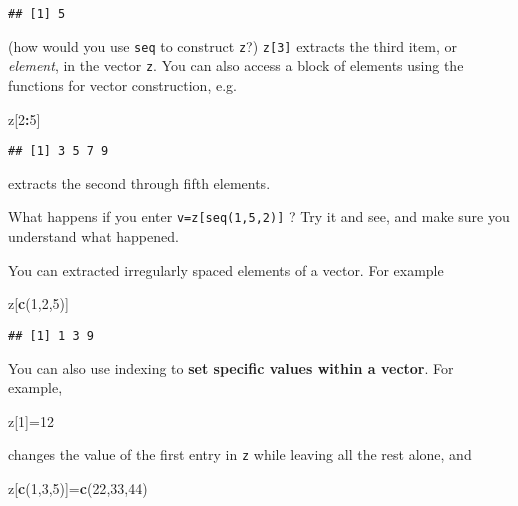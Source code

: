 \documentclass[11pt,]{article}
\newenvironment{Shaded}{\begin{snugshade}}{\end{snugshade}}
\newcommand{\KeywordTok}[1]{\textcolor[rgb]{0.13,0.29,0.53}{\textbf{#1}}}
\newcommand{\DecValTok}[1]{\textcolor[rgb]{0.00,0.00,0.81}{#1}}
\newcommand{\OperatorTok}[1]{\textcolor[rgb]{0.81,0.36,0.00}{\textbf{#1}}}
\newcommand{\NormalTok}[1]{#1}
\begin{document}
\begin{verbatim}
## [1] 5
\end{verbatim}

(how would you use \texttt{seq} to construct \texttt{z}?)
\texttt{z{[}3{]}} extracts the third item, or \emph{element}, in the
vector \texttt{z}. You can also access a block of elements using the
functions for vector construction, e.g.

\begin{Shaded}
\begin{Highlighting}[]
\NormalTok{z[}\DecValTok{2}\OperatorTok{:}\DecValTok{5}\NormalTok{]}
\end{Highlighting}
\end{Shaded}

\begin{verbatim}
## [1] 3 5 7 9
\end{verbatim}

extracts the second through fifth elements.

What happens if you enter \texttt{v=z{[}seq(1,5,2){]}} ? Try it and see,
and make sure you understand what happened.

You can extracted irregularly spaced elements of a vector. For example

\begin{Shaded}
\begin{Highlighting}[]
\NormalTok{z[}\KeywordTok{c}\NormalTok{(}\DecValTok{1}\NormalTok{,}\DecValTok{2}\NormalTok{,}\DecValTok{5}\NormalTok{)]}
\end{Highlighting}
\end{Shaded}

\begin{verbatim}
## [1] 1 3 9
\end{verbatim}

You can also use indexing to \textbf{set specific values within a
vector}. For example,

\begin{Shaded}
\begin{Highlighting}[]
\NormalTok{z[}\DecValTok{1}\NormalTok{]=}\DecValTok{12}
\end{Highlighting}
\end{Shaded}

changes the value of the first entry in \texttt{z} while leaving all the
rest alone, and

\begin{Shaded}
\begin{Highlighting}[]
\NormalTok{z[}\KeywordTok{c}\NormalTok{(}\DecValTok{1}\NormalTok{,}\DecValTok{3}\NormalTok{,}\DecValTok{5}\NormalTok{)]=}\KeywordTok{c}\NormalTok{(}\DecValTok{22}\NormalTok{,}\DecValTok{33}\NormalTok{,}\DecValTok{44}\NormalTok{)}
\end{Highlighting}
\end{Shaded}
\end{document}
